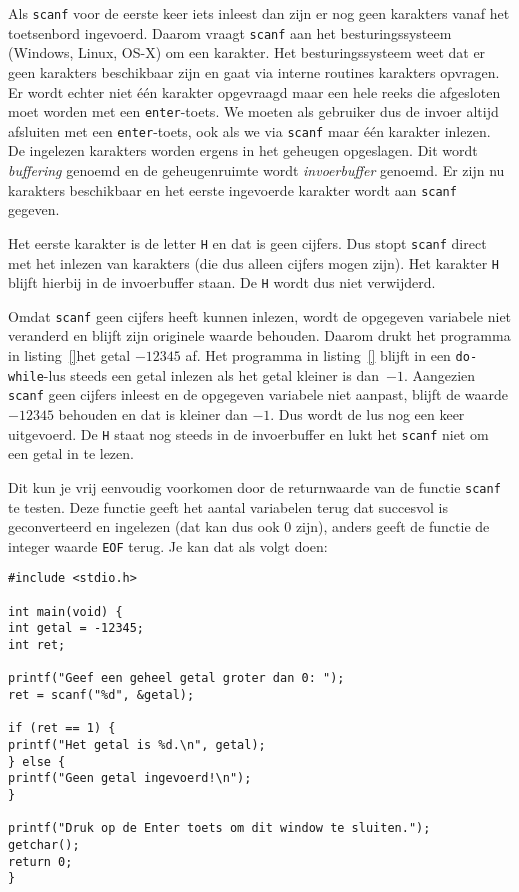 Als \texttt{scanf} voor de eerste keer iets inleest dan zijn er nog geen karakters vanaf het toetsenbord ingevoerd. Daarom vraagt \texttt{scanf} aan het besturingssysteem (Windows, Linux, OS-X) om een karakter. Het besturingssysteem weet dat er geen karakters beschikbaar zijn en gaat via interne routines karakters opvragen. Er wordt echter niet \'e\'en karakter opgevraagd maar een hele reeks die afgesloten moet worden met een \texttt{enter}-toets. We moeten als gebruiker dus de invoer altijd afsluiten met een \texttt{enter}-toets, ook als we via \texttt{scanf} maar \'e\'en karakter inlezen. De ingelezen karakters worden ergens in het geheugen opgeslagen. Dit wordt \textsl{buffering} genoemd en de geheugenruimte wordt \textsl{invoerbuffer} genoemd. Er zijn nu karakters beschikbaar en het eerste ingevoerde karakter wordt aan \texttt{scanf} gegeven.

Het eerste karakter is de letter \texttt{H} en dat is geen cijfers. Dus stopt \texttt{scanf} direct met het inlezen van karakters (die dus alleen cijfers mogen zijn). Het karakter \texttt{H} blijft hierbij in de invoerbuffer staan. De \texttt{H} wordt dus niet verwijderd.

Omdat \texttt{scanf} geen cijfers heeft kunnen inlezen, wordt de opgegeven variabele niet veranderd en blijft zijn originele waarde behouden. Daarom drukt het programma in listing~\ref{}het getal $-12345$ af. Het programma in listing~\ref{} blijft in een \texttt{do-while}-lus steeds een getal inlezen als het getal kleiner is dan~$-1$. Aangezien \texttt{scanf} geen cijfers inleest en de opgegeven variabele niet aanpast, blijft de waarde $-12345$ behouden en dat is kleiner dan $-1$. Dus wordt de lus nog een keer uitgevoerd. De \texttt{H} staat nog steeds in de invoerbuffer en lukt het \texttt{scanf} niet om een getal in te lezen.

Dit kun je vrij eenvoudig voorkomen door de returnwaarde van de functie \lstinline|scanf| te testen. Deze functie geeft het aantal variabelen terug dat succesvol is geconverteerd en ingelezen (dat kan dus ook 0 zijn), anders geeft de functie de integer waarde \lstinline|EOF| terug. Je kan dat als volgt doen:

\begin{lstlisting}
#include <stdio.h>

int main(void) {
int getal = -12345;
int ret;

printf("Geef een geheel getal groter dan 0: ");
ret = scanf("%d", &getal);

if (ret == 1) {
printf("Het getal is %d.\n", getal);
} else {
printf("Geen getal ingevoerd!\n");
}

printf("Druk op de Enter toets om dit window te sluiten.");
getchar();
return 0;
}
\end{lstlisting}

